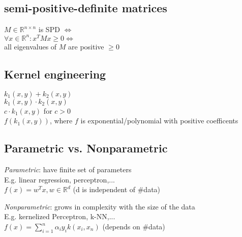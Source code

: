 \subsection*{semi-positive-definite matrices}
$M \in \mathbb{R}^{n\times n}$ is SPD $\Leftrightarrow$\\
$\forall x \in \mathbb{R}^n: x^TMx \geq 0 \Leftrightarrow$\\
all eigenvalues of $M$ are positive $\geq 0$

%
\subsection*{Kernel engineering}
$k_1(x,y) + k_2(x,y)$\\
$k_1(x,y) \cdot k_2(x,y)$\\
$c \cdot k_1(x,y)$ for $c>0$\\
$f(k_1(x,y))$, where $f$ is exponential/polynomial with positive coefficents

\subsection*{Parametric vs. Nonparametric}
\emph{Parametric}: have finite set of parameters\\
E.g. linear regression, perceptron,...\\
$f(x) = w^Tx, w\in \mathbb{R}^d$ (d is independent of #data)

\emph{Nonparametric}: grows in complexity with the size of the data\\
E.g. kernelized Perceptron, k-NN,...\\
$f(x) = \sum_{i=1}^n \alpha_i y_i k(x_i,x_n)$ (depends on #data)\\


